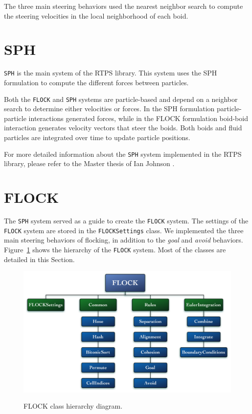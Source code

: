 The three main steering behaviors used the nearest neighbor search to compute the steering velocities in the local neighborhood of each boid.

\section{SPH}\label{sphsection}
\texttt{SPH} is the main system of the RTPS library. This system uses the SPH formulation to compute the different forces between particles.

Both the \texttt{FLOCK} and \texttt{SPH} systems are particle-based and depend on a neighbor search to determine either velocities or forces. In the SPH formulation particle-particle interactions generated forces, while in the FLOCK formulation boid-boid interaction generates velocity vectors that steer the boids. Both boids and fluid particles are integrated over time to update particle positions.

For more detailed information about the \texttt{SPH} system implemented in the RTPS library, please refer to the Master thesis of Ian Johnson \cite{ianThesis}.

\section{FLOCK}\label{flocksection}
The \texttt{SPH} system served as a guide to create the \texttt{FLOCK} system. The settings of the \texttt{FLOCK} system are stored in the \texttt{FLOCKSettings} class. We implemented the three main steering behaviors of flocking, in addition to the \textit{goal} and \textit{avoid} behaviors. Figure~\ref{flockdiagram} shows the hierarchy of the \texttt{FLOCK} system. Most of the classes are detailed in this Section. 

\begin{figure}[htbp]
\begin{center}
\includegraphics[scale=0.42]{figures/FLOCKdiagramMyrna.pdf}
\caption{FLOCK class hierarchy diagram.} 
\label{flockdiagram}
\end{center}
\end{figure}



